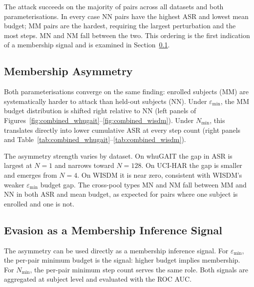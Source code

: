\FloatBarrier

The attack succeeds on the majority of pairs across all datasets and both parameterisations. In every case NN pairs have the highest ASR and lowest mean budget; MM pairs are the hardest, requiring the largest perturbation and the most steps. MN and NM fall between the two. This ordering is the first indication of a membership signal and is examined in Section~\ref{ssec:ev_asymmetry}.

\subsection{Membership Asymmetry}
\label{ssec:ev_asymmetry}

Both parameterisations converge on the same finding: enrolled subjects (MM) are systematically harder to attack than held-out subjects (NN). Under $\varepsilon_\text{min}$, the MM budget distribution is shifted right relative to NN (left panels of Figures~\ref{fig:combined_whugait}--\ref{fig:combined_wisdm}). Under $N_\text{min}$, this translates directly into lower cumulative ASR at every step count (right panels and Table~\ref{tab:combined_whugait}--\ref{tab:combined_wisdm}).

The asymmetry strength varies by dataset. On whuGAIT the gap in ASR is largest at $N = 1$ and narrows toward $N = 128$. On UCI-HAR the gap is smaller and emerges from $N = 4$. On WISDM it is near zero, consistent with WISDM's weaker $\varepsilon_\text{min}$ budget gap. The cross-pool types MN and NM fall between MM and NN in both ASR and mean budget, as expected for pairs where one subject is enrolled and one is not.

\subsection{Evasion as a Membership Inference Signal}
\label{ssec:ev_mia_signal}

The asymmetry can be used directly as a membership inference signal. For $\varepsilon_\text{min}$, the per-pair minimum budget is the signal: higher budget implies membership. For $N_\text{min}$, the per-pair minimum step count serves the same role. Both signals are aggregated at subject level and evaluated with the ROC AUC.

